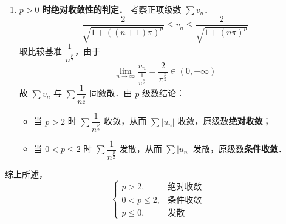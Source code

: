 \documentclass[12pt, a4paper, oneside, UTF8]{ctexbook}
\begin{document}
\begin{solution}
\begin{enumerate}[label=\Roman*.]
        \item\textbf{$p > 0$ 时绝对收敛性的判定．} 考察正项级数 $\sum v_n$．
        \[ \frac{2}{\sqrt{1+((n+1)\pi)^p}} \le v_n \le \frac{2}{\sqrt{1+(n\pi)^p}} \]
        取比较基准 $\dfrac{1}{n^{\frac{p}{2}}}$，由于
        \[ \lim_{n\to\infty} \frac{v_n}{\frac{1}{n^{\frac{p}{2}}}} = \frac{2}{\pi^{\frac{p}{2}}} \in (0, +\infty) \]
        故 $\sum v_n$ 与 $\sum \dfrac{1}{n^{\frac{p}{2}}}$ 同敛散．由 $p$-级数结论：
        \begin{itemize}
            \item 当 $p > 2$ 时 $\sum \dfrac{1}{n^{\frac{p}{2}}}$ 收敛，从而 $\sum |u_n|$ 收敛，原级数\textbf{绝对收敛}；
            \item 当 $0 < p \le 2$ 时 $\sum \dfrac{1}{n^{\frac{p}{2}}}$ 发散，从而 $\sum |u_n|$ 发散，原级数\textbf{条件收敛}．
        \end{itemize}
    \end{enumerate}

    综上所述，
    \[ \boxed{\begin{cases}
        p > 2, & \text{绝对收敛} \\[4pt]
        0 < p \le 2, & \text{条件收敛} \\[4pt]
        p \le 0, & \text{发散}
    \end{cases}} \]
\end{solution}
\ifx\allfiles\undefined
\end{document}

